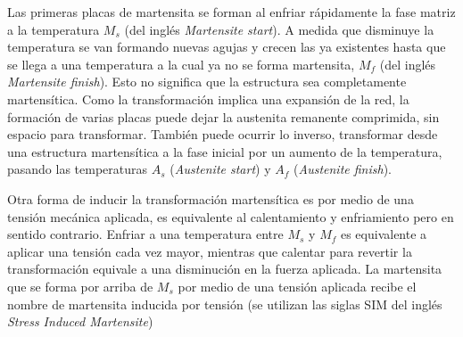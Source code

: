 \documentclass[a4paper,12pt,fleqn,twoside,openany]{book}
\begin{document}
Las primeras placas de martensita se forman al enfriar rápidamente la fase matriz a la temperatura $M_{s}$ (del inglés \textit{Martensite start}). 
A medida que disminuye la temperatura se van formando nuevas agujas y crecen las ya existentes hasta que se llega a una temperatura 
a la cual ya no se forma martensita, $M_{f}$ (del inglés \textit{Martensite finish}). Esto no significa que la estructura sea completamente martensítica. 
Como la transformación implica una expansión de la red, la formación de varias placas puede dejar la austenita remanente comprimida, 
sin espacio para transformar. También puede ocurrir lo inverso, transformar desde una estructura martensítica a la fase inicial 
por un aumento de la temperatura, pasando las temperaturas $A_{s}$ (\textit{Austenite start}) y $A_{f}$ (\textit{Austenite finish}).

  

Otra forma de inducir la transformación martensítica es por medio de una tensión mecánica aplicada, es equivalente al calentamiento y enfriamiento pero en 
sentido contrario. Enfriar a una temperatura entre $M_{s}$ y $M_{f}$ es equivalente a aplicar una tensión cada vez mayor, mientras que calentar para revertir la 
transformación equivale a una disminución en la fuerza aplicada. La martensita que se forma por arriba de $M_{s}$ por medio de una 
tensión aplicada recibe el nombre de martensita inducida por tensión (se utilizan las siglas SIM del inglés \textit{Stress Induced Martensite})

  
\end{document}

